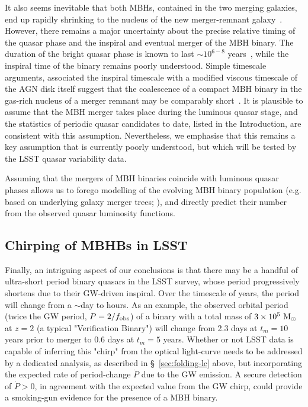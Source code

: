 \documentclass[fleqn,usenatbib]{mnras}
\begin{document}
It also seems inevitable that both MBHs, contained in the two merging galaxies, end up rapidly shrinking to the nucleus of the new merger-remnant galaxy~\citep[e.g.][]{Begelman+1980}.   However, there remains a major uncertainty about the precise relative timing of the quasar phase and the inspiral and eventual merger of the MBH binary. The duration of the bright quasar phase is known to last $\sim 10^{6-8}$ years~\citep[e.g.][]{Martini+2004}, while the inspiral time of the binary remains poorly understood.   Simple timescale arguments, associated the inspiral timescale with a modified viscous timescale of the AGN disk itself suggest that the coalescence of a compact MBH binary in the gas-rich nucleus of a merger remnant may be comparably short~\citep{Haiman2009a}.   It is plausible to assume that the MBH merger takes place during the luminous quasar stage, and the statistics of periodic quasar candidates to date, listed in the Introduction, are consistent with this assumption.  Nevertheless, we emphasise that this remains a key assumption that is currently poorly understood, but which will be tested by the LSST quasar variability data.

Assuming that the mergers of MBH binaries coincide with luminous quasar phases allows us to forego modelling of the evolving MBH binary population (e.g. based on underlying galaxy merger trees; \citealt{Kelley+2019}), and directly predict their number from the observed quasar luminosity functions.

\subsection{Chirping of MBHBs in LSST} 
\label{sec:chirping}

Finally, an intriguing aspect of our conclusions is that there may be a handful of ultra-short period binary quasars in the LSST survey, whose period progressively shortens due to their GW-driven inspiral. Over the timescale of years, the period will change from a $\sim$day to hours.  As an example, the observed orbital period (twice the GW period, $P=2/f_{\rm obs}$) of a binary with a total mass of $3\times 10^5~{\rm M_\odot}$ at $z=2$ (a typical "Verification Binary") will change from 2.3 days at $t_m=10$ years prior to merger to 0.6 days at $t_m=5$ years.  
Whether or not LSST data is capable of inferring this "chirp" from the optical light-curve needs to be addressed by a dedicated analysis, as described in \S~\ref{sec:folding-lc} above, but incorporating the expected rate of period-change $\dot{P}$ due to the GW emission.   A secure detection of $\dot{P}>0$, in agreement with the expected value from the GW chirp, could provide a 
smoking-gun evidence for the presence of a MBH binary.
\end{document}
